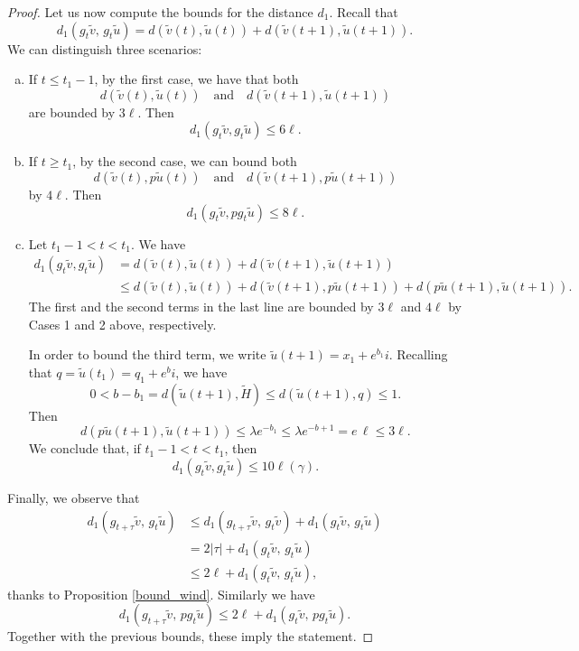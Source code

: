 \documentclass[a4paper,english,reqno]{amsart}
\theoremstyle{definition}
\numberwithin{equation}{section}
\begin{document}
\begin{proof}
 	\smallskip
 	
 Let us now compute the bounds for the distance $d_1$. Recall that 
 \[
d_1\!\left(g_{t} \tilde v ,\, g_t\tilde u\right) = d(\tilde v (t), \tilde u (t)) + d(\tilde v (t+1), \tilde u (t+1)). 
 \]
 We can distinguish three scenarios:
 
 \begin{enumerate}[(a)]
 	\item If $t \le t_1 -1 $, by the first case, we have that both
 	\[
 	d(\tilde v(t), \tilde u(t))
 	\quad \text{and} \quad
 	d(\tilde v(t+1), \tilde u(t+1))
 	\]
 	are bounded by $3\ell$. Then
 	\[
 	d_1(g_{t}\tilde v, g_t \tilde u) \le 6\ell.
 	\]
 	
 	\item If $t \ge t_1$, by the second case, we can
 	bound both
 	\[
 	d(\tilde v(t), p \tilde u(t))
 	\quad \text{and} \quad
 	d(\tilde v(t+1), p \tilde u(t+1))
 	\]
 	by $4\ell$. Then
 	\[
 	d_1(g_{t}\tilde v, p g_t \tilde u) \le 8 \ell.
 	\]
 	
 	\item Let $t_1 -1 < t < t_1$. We have
 	\begin{align*}
 		d_1(g_{t}\tilde v, g_t \tilde u) &= d(\tilde v (t), \tilde u (t)) + d(\tilde v (t+1), \tilde u (t+1)) \\
 		&\le  d(\tilde v (t), \tilde u (t)) + d(\tilde v (t+1), p \tilde u (t+1)) + d( p \tilde u (t+1), \tilde u (t+1)).
 	\end{align*}
	The first and the second terms in the last line are bounded by $3\ell$ and $4 \ell$ by Cases 1 and 2 above, respectively. 
 	
	In order to bound the third term, we write $\tilde u (t+1) =x_1 + e^{b_1} i$. Recalling that $q=\tilde u (t_1)= q_1 +e^b i$, we have
	\[
	0<b-b_1= d(\tilde u (t+1), \tilde H)\le d(\tilde u (t+1), q) \le 1.
	\]
	Then \[
	d(p \tilde u (t+1), \tilde u (t+1)) \le \lambda e^{-b_1} \le \lambda e^{-b +1} = e \,\ell\le 3 \ell.
	\] We conclude that, if $t_1 -1 < t < t_1$, then 
	\[
	d_1(g_{t}\tilde v, g_t \tilde u) \le 10 \ell(\gamma).
	\]
 
 
 \end{enumerate}

Finally, we observe that 
\begin{align*}
	d_1\!\left(g_{t+\tau} \tilde v ,\, g_t\tilde u\right) & \le d_1\!\left(g_{t+\tau} \tilde v ,\, g_t\tilde v\right) + d_1\!\left(g_{t} \tilde v ,\, g_t\tilde u\right)\\
	& =  2|\tau| + d_1\!\left(g_{t} \tilde v ,\, g_t\tilde u\right) \\
	&\le  2\ell + d_1\!\left(g_{t} \tilde v ,\, g_t\tilde u\right),
\end{align*}
thanks to Proposition \ref{bound_wind}. Similarly we have
\[
d_1\!\left(g_{t+\tau} \tilde v ,\, p g_t\tilde u\right) \le 2\ell + d_1\!\left(g_{t} \tilde v ,\, p g_t\tilde u\right).
\]
Together with the previous bounds, these imply the statement.
 \end{proof}
\end{document}
